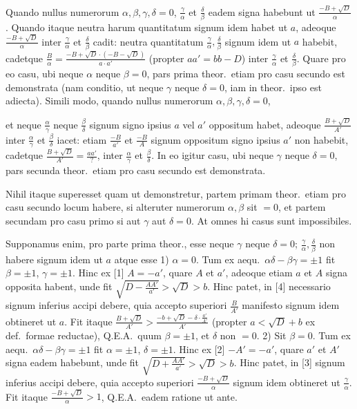\documentclass[12pt,a4paper]{article}
\theoremstyle{plain}
\theoremstyle{definition}
\theoremstyle{remark}
\newcommand{\qeoa}{\textsc{Q.E.A.}}
\begin{document}
Quando nullus numerorum $\alpha,\beta,\gamma,\delta=0$, $\frac{\gamma}{\alpha}$ et $\frac{\delta}{\beta}$ eadem signa habebunt ut $\frac{-B+\sqrt{D}}{\alpha}$. Quando itaque neutra harum quantitatum signum idem habet ut $a$, adeoque $\frac{-B+\sqrt{D}}{\alpha}$ inter $\frac{\gamma}{\alpha}$ et $\frac{\delta}{\beta}$ cadit: neutra quantitatum $\frac{\gamma}{\alpha},\frac{\delta}{\beta}$ signum idem ut $a$ habebit, cadetque $\frac{B}{\alpha}=\frac{-B+\sqrt{D}\cdot(-B-\sqrt{D})}{a\cdot a'}$ (propter $aa'=bb-D$) inter $\frac{\gamma}{\alpha}$ et $\frac{\delta}{\beta}$. Quare pro eo casu, ubi neque $\alpha$ neque $\beta=0$, pars prima theor.\ etiam pro casu secundo est demonstrata (nam conditio, ut neque $\gamma$ neque $\delta=0$, iam in theor.\ ipso est adiecta). Simili modo, quando nullus numerorum $\alpha,\beta,\gamma,\delta=0$,

et neque $\frac{\alpha}{\gamma}$ neque $\frac{\beta}{\delta}$ signum signo ipsius $a$ vel $a'$ oppositum habet, adeoque $\frac{B+\sqrt{D}}{A'}$ inter $\frac{\alpha}{\gamma}$ et $\frac{\beta}{\delta}$ iacet: etiam $\frac{-B}{a'}$ et $\frac{-B}{A}$ signum oppositum signo ipsius $a'$ non habebit, cadetque $\frac{B+\sqrt{D}}{A'}=\frac{aa'}{?}$, inter $\frac{\alpha}{\gamma}$ et $\frac{\beta}{\delta}$. In eo igitur casu, ubi neque $\gamma$ neque $\delta=0$, pars secunda theor.\ etiam pro casu secundo est demonstrata.

Nihil itaque superesset quam ut demonstretur, partem primam theor.\ etiam pro casu secundo locum habere, si alteruter numerorum $\alpha,\beta$ sit $=0$, et partem secundam pro casu primo si aut $\gamma$ aut $\delta=0$. At omnes hi casus sunt impossibiles.

Supponamus enim, pro parte prima theor., esse neque $\gamma$ neque $\delta=0$; $\frac{\gamma}{\alpha},\frac{\delta}{\beta}$ non habere signum idem ut $a$ atque esse 1) $\alpha=0$. Tum ex aequ.\ $\alpha\delta-\beta\gamma=\pm 1$ fit $\beta=\pm 1$, $\gamma=\pm 1$. Hinc ex [1] $A=-a'$, quare $A$ et $a'$, adeoque etiam $a$ et $A$ signa opposita habent, unde fit $\sqrt{D-\frac{AA'}{a'}}>\sqrt{D}>b$. Hinc patet, in [4] necessario signum inferius accipi debere, quia accepto superiori $\frac{B}{A'}$ manifesto signum idem obtineret ut $a$. Fit itaque $\frac{B+\sqrt{D}}{A'}>\frac{-b+\sqrt{D}-\delta\cdot\frac{a'}{A'}}{A'}$ (propter $a<\sqrt{D}+b$ ex def.\ formae reductae), \qeoa\ quum $\beta=\pm 1$, et $\delta$ non $=0$. 2) Sit $\beta=0$. Tum ex aequ.\ $\alpha\delta-\beta\gamma=\pm 1$ fit $\alpha=\pm 1$, $\delta=\pm 1$. Hinc ex [2] $-A'=-a'$, quare $a'$ et $A'$ signa eadem habebunt, unde fit $\sqrt{D+\frac{AA'}{a'}}>\sqrt{D}>b$. Hinc patet, in [3] signum inferius accipi debere, quia accepto superiori $\frac{-B+\sqrt{D}}{\alpha}$ signum idem obtineret ut $\frac{\gamma}{\alpha}$. Fit itaque $\frac{-B+\sqrt{D}}{\alpha}>1$, \qeoa\ eadem ratione ut ante.
\end{document}
